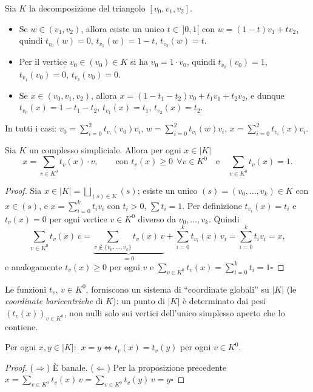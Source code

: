 \begin{ejemplo}
Sia $K$ la decomposizione del triangolo $[v_0, v_1, v_2]$.
\begin{itemize}
    \item Se $w \in (v_1, v_2)$, allora esiste un unico $t \in\, ]0,1[$ con $w = (1-t)v_1 + tv_2$, quindi $t_{v_0}(w) = 0$, $t_{v_1}(w) = 1-t$, $t_{v_2}(w) = t$.
    \item Per il vertice $v_0 \in (v_0) \in K$ si ha $v_0 = 1 \cdot v_0$, quindi $t_{v_0}(v_0) = 1$, $t_{v_1}(v_0) = 0$, $t_{v_2}(v_0) = 0$.
    \item Se $x \in (v_0, v_1, v_2)$, allora $x = (1 - t_1 - t_2)v_0 + t_1 v_1 + t_2 v_2$, e dunque $t_{v_0}(x) = 1 - t_1 - t_2$, $t_{v_1}(x) = t_1$, $t_{v_2}(x) = t_2$.
\end{itemize}
In tutti i casi: $v_0 = \sum_{i=0}^2 t_{v_i}(v_0) v_i$, $w = \sum_{i=0}^2 t_{v_i}(w) v_i$, $x = \sum_{i=0}^2 t_{v_i}(x) v_i$.
\end{ejemplo}

\begin{prop}
Sia $K$ un complesso simpliciale. Allora per ogni $x \in |K|$
\[
x = \sum_{v \in K^0} t_v(x) \cdot v, \qquad \text{con } t_v(x) \geqslant 0 \ \ \forall v \in K^0 \quad \text{e} \quad \sum_{v \in K^0} t_v(x) = 1 .
\]
\end{prop}
\begin{proof}
Sia $x \in |K| = \bigsqcup_{(s) \in K} (s)$; esiste un unico $(s) = (v_0, \dots, v_k) \in K$ con $x \in (s)$, e $x = \sum_{i=0}^k t_i v_i$ con $t_i > 0$, $\sum t_i = 1$. Per definizione $t_{v_i}(x) = t_i$ e $t_v(x) = 0$ per ogni vertice $v \in K^0$ diverso da $v_0, \dots, v_k$. Quindi
\[
\sum_{v \in K^0} t_v(x)\, v = \underbrace{\sum_{v \notin \{v_0, \dots, v_k\}} t_v(x)\, v}_{=0} + \sum_{i=0}^k t_{v_i}(x)\, v_i = \sum_{i=0}^k t_i v_i = x,
\]
e analogamente $t_v(x) \geqslant 0$ per ogni $v$ e $\sum_{v \in K^0} t_v(x) = \sum_{i=0}^k t_i = 1$\hfill$\square$
\end{proof}

\begin{intuizione}
Le funzioni $t_v$, $v \in K^0$, forniscono un sistema di ``coordinate globali'' su $|K|$ (le \emph{coordinate baricentriche} di $K$): un punto di $|K|$ \`e determinato dai pesi $(t_v(x))_{v \in K^0}$, non nulli solo sui vertici dell'unico simplesso aperto che lo contiene.
\end{intuizione}


\begin{lema}
Per ogni $x, y \in |K|$: $\ x = y \iff t_v(x) = t_v(y)$ per ogni $v \in K^0$.
\end{lema}
\begin{proof}
($\Rightarrow$) \`E banale. ($\Leftarrow$) Per la proposizione precedente $x = \sum_{v \in K^0} t_v(x)\, v = \sum_{v \in K^0} t_v(y)\, v = y$\hfill$\square$
\end{proof}

